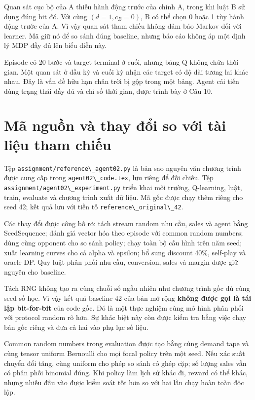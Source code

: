 Quan sát cục bộ của A thiếu hành động trước của chính A, trong khi luật
B sử dụng đúng bit đó. Với cùng \((d=1,c_B=0)\), B có thể chọn 0 hoặc 1
tùy hành động trước của A. Vì vậy quan sát tham chiếu không đảm bảo
Markov đối với learner. Mã giữ nó để so sánh đúng baseline, nhưng báo
cáo không áp một định lý MDP đầy đủ lên biểu diễn này.

Episode có 20 bước và target terminal ở cuối, nhưng bảng Q không chứa
thời gian. Một quan sát ở đầu kỳ và cuối kỳ nhận các target có độ dài
tương lai khác nhau. Đây là vấn đề hữu hạn chân trời bị gộp trong một
bảng. Agent cải tiến dùng trạng thái đầy đủ và chỉ số thời gian, được
trình bày ở Câu 10.

\section{Mã nguồn và thay đổi so với tài liệu tham
chiếu}\label{muxe3-nguux1ed3n-vuxe0-thay-ux111ux1ed5i-so-vux1edbi-tuxe0i-liux1ec7u-tham-chiux1ebfu}

Tệp \passthrough{\lstinline!assignment/reference\_agent02.py!} là bản
sao nguyên văn chương trình được cung cấp trong
\passthrough{\lstinline!agent02\_code.tex!}, lưu riêng để đối chiếu. Tệp
\passthrough{\lstinline!assignment/agent02\_experiment.py!} triển khai
môi trường, Q-learning, luật, train, evaluate và chương trình xuất dữ
liệu. Mã gốc được chạy thêm riêng cho seed 42; kết quả lưu với tiền tố
\passthrough{\lstinline!reference\_original\_42!}.

Các thay đổi được công bố rõ: tách stream random nhu cầu, sales và agent
bằng SeedSequence; đánh giá vector hóa theo episode với common random
numbers; dùng cùng opponent cho so sánh policy; chạy toàn bộ cấu hình
trên năm seed; xuất learning curves cho cả alpha và epsilon; bổ sung
discount 40\%, self-play và oracle DP. Quy luật phân phối nhu cầu,
conversion, sales và margin được giữ nguyên cho baseline.

Tách RNG không tạo ra cùng chuỗi số ngẫu nhiên như chương trình gốc dù
cùng seed số học. Vì vậy kết quả baseline 42 của bản mở rộng
\textbf{không được gọi là tái lập bit-for-bit} của code gốc. Đó là một
thực nghiệm cùng mô hình phân phối với protocol random rõ hơn. Sự khác
biệt này còn được kiểm tra bằng việc chạy bản gốc riêng và đưa cả hai
vào phụ lục số liệu.

Common random numbers trong evaluation được tạo bằng cùng demand tape và
cùng tensor uniform Bernoulli cho mọi focal policy trên một seed. Nếu
xác suất chuyển đổi tăng, cùng uniform cho phép so sánh có ghép cặp; số
lượng sales vẫn có phân phối binomial đúng. Khi policy làm lịch sử khác
đi, reward có thể khác, nhưng nhiễu đầu vào được kiểm soát tốt hơn so
với hai lần chạy hoàn toàn độc lập.


